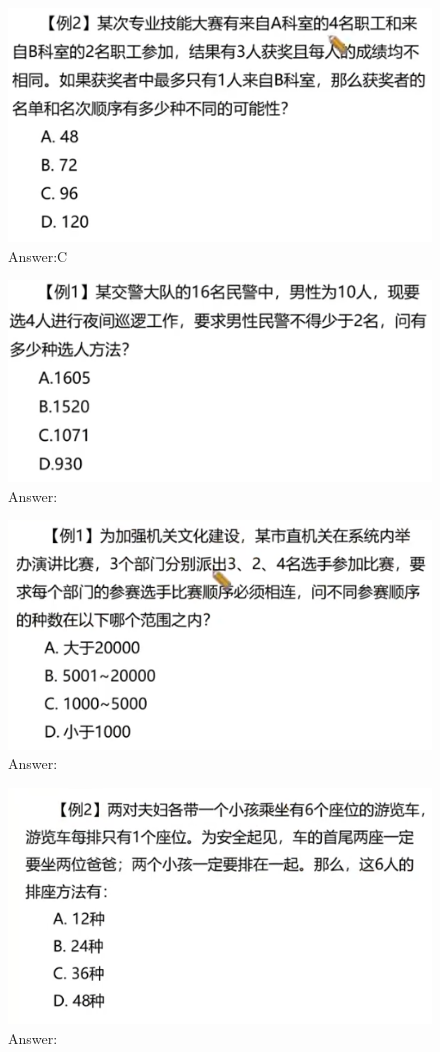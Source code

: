 \documentclass{article}
\numberwithin{equation}{section}						%
\numberwithin{figure}{section}							%
\begin{document}
\begin{sloppypar}
\begin{figure}[H]
     \centering
     \includegraphics[width=0.6\linewidth]{290.png}
		\caption{Answer:C}
\end{figure}


\begin{figure}[H]
     \centering
     \includegraphics[width=0.6\linewidth]{291.png}
		\caption{Answer:}
\end{figure}


\begin{figure}[H]
     \centering
     \includegraphics[width=0.6\linewidth]{292.png}
		\caption{Answer:}
\end{figure}

\begin{figure}[H]
     \centering
     \includegraphics[width=0.6\linewidth]{293.png}
		\caption{Answer:}
\end{figure}


\end{sloppypar}
\end{document}
